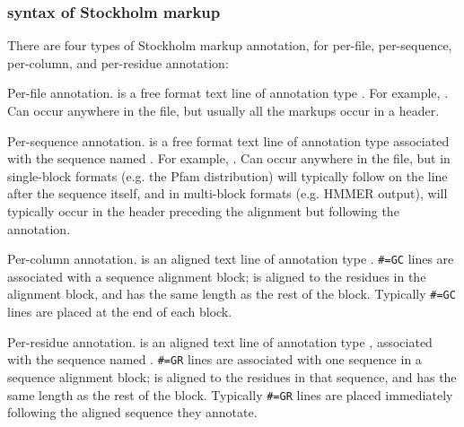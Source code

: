 \subsubsection{syntax of Stockholm markup}

There are four types of Stockholm markup annotation, for per-file,
per-sequence, per-column, and per-residue annotation:

\begin{sreitems}{}
\item [\emprog{\#=GF <tag> <s>}]
        Per-file annotation.  is a free format text line
        of annotation type . For example, . Can occur anywhere in the file, but usually
        all the  markups occur in a header.

\item [\emprog{\#=GS <seqname> <tag> <s>}]
        Per-sequence annotation.  is a free format text line
        of annotation type  associated with the sequence
        named . For example, . Can occur anywhere
        in the file, but in single-block formats (e.g. the Pfam
        distribution) will typically follow on the line after the
        sequence itself, and in multi-block formats (e.g. HMMER
        output), will typically occur in the header preceding the
        alignment but following the  annotation.

\item [\emprog{\#=GC <tag> <..s..>}]
        Per-column annotation.  is an aligned text line
        of annotation type .
        \verb+#=GC+ lines are
        associated with a sequence alignment block; 
        is aligned to the residues in the alignment block, and has
        the same length as the rest of the block.
        Typically \verb+#=GC+ lines are placed at the end of each block.

\item [\emprog{\#=GR <seqname> <tag> <..s..>}]
        Per-residue annotation.  is an aligned text line
        of annotation type , associated with the sequence
        named . 
        \verb+#=GR+ lines are 
        associated with one sequence in a sequence alignment block; 
        is aligned to the residues in that sequence, and has
        the same length as the rest of the block.
        Typically
        \verb+#=GR+ lines are placed immediately following the
        aligned sequence they annotate.
\end{sreitems}

